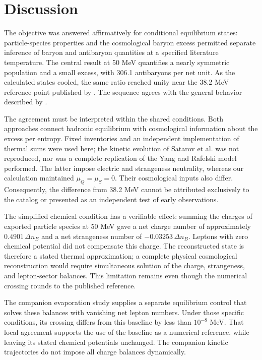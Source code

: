 \section{Discussion}
The objective was answered affirmatively for conditional equilibrium states: particle-species properties and the cosmological baryon excess permitted separate inference of baryon and antibaryon quantities at a specified literature temperature. The central result at 50 MeV quantifies a nearly symmetric population and a small excess, with 306.1 antibaryons per net unit. As the calculated states cooled, the same ratio reached unity near the 38.2 MeV reference point published by \citet{Yang2022}. The sequence agrees with the general behavior described by \citet{Satarov2013}.

The agreement must be interpreted within the shared conditions. Both approaches connect hadronic equilibrium with cosmological information about the excess per entropy. Fixed inventories and an independent implementation of thermal sums were used here; the kinetic evolution of Satarov et al. was not reproduced, nor was a complete replication of the Yang and Rafelski model performed. The latter impose electric and strangeness neutrality, whereas our calculation maintained $\mu_Q=\mu_S=0$. Their cosmological inputs also differ. Consequently, the difference from 38.2 MeV cannot be attributed exclusively to the catalog or presented as an independent test of early observations.

The simplified chemical condition has a verifiable effect: summing the charges of exported particle species at 50 MeV gave a net charge number of approximately $0.4901\,\Delta n_B$ and a net strangeness number of $-0.03253\,\Delta n_B$. Leptons with zero chemical potential did not compensate this charge. The reconstructed state is therefore a stated thermal approximation; a complete physical cosmological reconstruction would require simultaneous solution of the charge, strangeness, and lepton-sector balances. This limitation remains even though the numerical crossing rounds to the published reference.

The companion evaporation study \citep{GarciaEvap2026} supplies a separate equilibrium control that solves these balances with vanishing net lepton numbers. Under those specific conditions, its crossing differs from this baseline by less than $10^{-8}$ MeV. That local agreement supports the use of the baseline as a numerical reference, while leaving its stated chemical potentials unchanged. The companion kinetic trajectories do not impose all charge balances dynamically.

